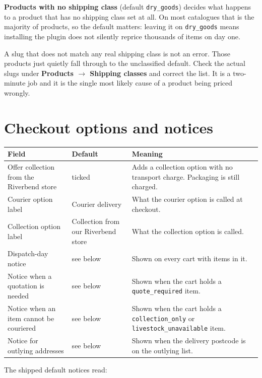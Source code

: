\documentclass[11pt,a4paper,oneside]{report}
\newcommand{\opt}[1]{\texttt{\small #1}}
\newcommand{\menu}[1]{\textsf{\textbf{#1}}}
\newcommand{\yes}{\textsf{ticked}}
\begin{document}
\textbf{Products with no shipping class} (default \opt{dry\_goods}) decides what
happens to a product that has no shipping class set at all. On most catalogues that
is the majority of products, so the default matters: leaving it on \opt{dry\_goods}
means installing the plugin does not silently reprice thousands of items on day one.

\begin{housewarn}
A slug that does not match any real shipping class is not an error. Those products
just quietly fall through to the unclassified default. Check the actual slugs under
\menu{Products $\rightarrow$ Shipping classes} and correct the list. It is a
two-minute job and it is the single most likely cause of a product being priced
wrongly.
\end{housewarn}

\section{Checkout options and notices}

\begin{longtable}{@{}L{4.6cm}L{4.0cm}L{6.2cm}@{}}
\toprule
\textbf{Field} & \textbf{Default} & \textbf{Meaning}\\
\midrule
\endhead
Offer collection from the Riverbend store & \yes & Adds a collection option with no transport charge. Packaging is still charged.\\
\addlinespace
Courier option label & \textsf{Courier delivery} & What the courier option is called at checkout.\\
\addlinespace
Collection option label & \textsf{Collection from our Riverbend store} & What the collection option is called.\\
\addlinespace
Dispatch-day notice & see below & Shown on every cart with items in it.\\
\addlinespace
Notice when a quotation is needed & see below & Shown when the cart holds a \opt{quote\_required} item.\\
\addlinespace
Notice when an item cannot be couriered & see below & Shown when the cart holds a \opt{collection\_only} or \opt{livestock\_unavailable} item.\\
\addlinespace
Notice for outlying addresses & see below & Shown when the delivery postcode is on the outlying list.\\
\bottomrule
\end{longtable}

The shipped default notices read:
\end{document}
